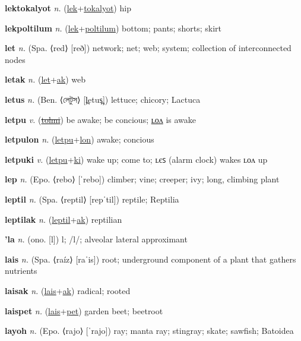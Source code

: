 \textbf{\hypertarget{lektokalyot}{lektokalyot}} \textit{n.} (\hyperlink{lek}{lek}+\allowbreak \hyperlink{tokalyot}{tokalyot})
hip

\textbf{\hypertarget{lekpoltilum}{lekpoltilum}} \textit{n.} (\hyperlink{lek}{lek}+\allowbreak \hyperlink{poltilum}{poltilum})
bottom; pants; shorts; skirt

\textbf{\hypertarget{let}{let}} \textit{n.} (Spa. ⟨red⟩ [reð])
network; net; web; system; collection of interconnected nodes

\textbf{\hypertarget{letak}{letak}} \textit{n.} (\hyperlink{let}{let}+\allowbreak \hyperlink{ak}{ak})
web

\textbf{\hypertarget{letus}{letus}} \textit{n.} (Ben. ⟨{\bengali{}লেটুস}⟩ [l̪etus̪])
lettuce; chicory; Lactuca

\textbf{\hypertarget{letpu}{letpu}} \textit{v.} (\hyperlink{tolmi}{\sout{tolmi}})
be awake; be concious; \hyperlink{letpulon}{ʟᴏᴧ} is awake

\textbf{\hypertarget{letpulon}{letpulon}} \textit{n.} (\hyperlink{letpu}{letpu}+\allowbreak \hyperlink{lon}{lon})
awake; concious

\textbf{\hypertarget{letpuki}{letpuki}} \textit{v.} (\hyperlink{letpu}{letpu}+\allowbreak \hyperlink{ki}{ki})
wake up; come to; ʟєꜱ (alarm clock) wakes ʟᴏᴧ up

\textbf{\hypertarget{lep}{lep}} \textit{n.} (Epo. ⟨rebo⟩ [ˈrebo])
climber; vine; creeper; ivy; long, climbing plant

\textbf{\hypertarget{leptil}{leptil}} \textit{n.} (Spa. ⟨reptil⟩ [repˈtil])
reptile; Reptilia

\textbf{\hypertarget{leptilak}{leptilak}} \textit{n.} (\hyperlink{leptil}{leptil}+\allowbreak \hyperlink{ak}{ak})
reptilian

\textbf{\hypertarget{'la}{'la}} \textit{n.} (ono. [l])
l; /l/; alveolar lateral approximant

\textbf{\hypertarget{lais}{lais}} \textit{n.} (Spa. ⟨raíz⟩ [raˈis])
root; underground component of a plant that gathers nutrients

\textbf{\hypertarget{laisak}{laisak}} \textit{n.} (\hyperlink{lais}{lais}+\allowbreak \hyperlink{ak}{ak})
radical; rooted

\textbf{\hypertarget{laispet}{laispet}} \textit{n.} (\hyperlink{lais}{lais}+\allowbreak \hyperlink{pet}{pet})
garden beet; beetroot

\textbf{\hypertarget{layoh}{layoh}} \textit{n.} (Epo. ⟨rajo⟩ [ˈrajo])
ray; manta ray; stingray; skate; sawfish; Batoidea

